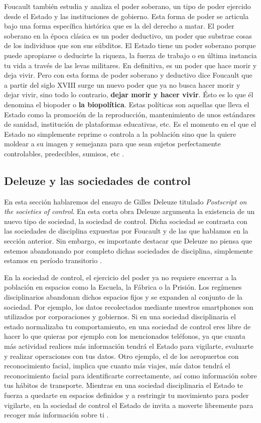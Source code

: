 \documentclass[11pt]{article}
\begin{document}
Foucault también estudia y analiza el poder soberano, un tipo de poder ejercido desde el Estado y las instituciones de gobierno. Esta forma de poder se articula bajo una forma específica histórica que es la del derecho a matar. El poder soberano en la época clásica es un poder deductivo, un poder que substrae cosas de los individuos que son sus súbditos. El Estado tiene un poder soberano porque puede apropiarse o deducirte la riqueza, la fuerza de trabajo o en última instancia tu vida a través de las levas militares. En definitiva, es un poder que hace morir y deja vivir. Pero con esta forma de poder soberano y deductivo dice Foucault que a partir del siglo XVIII surge un nuevo poder que ya no busca hacer morir y dejar vivir, sino todo lo contrario, \textbf{dejar morir y hacer vivir}. Ésto es lo que él denomina el biopoder o \textbf{la biopolítica}. Estas políticas son aquellas que lleva el Estado como la promoción de la reproducción, mantenimiento de unos estándares de sanidad, institución de plataformas educativas, etc. Es el momento en el que el Estado no simplemente reprime o controla a la población sino que la quiere moldear a su imagen y semejanza para que sean sujetos perfectamente controlables, predecibles, sumisos, etc \cite{ernesto-foucault}.
\subsection{Deleuze y las sociedades de control}
En esta sección hablaremos del ensayo de Gilles Deleuze titulado \textit{Postscript on the societies of control}. En esta corta obra Deleuze argumenta la existencia de un nuevo tipo de sociedad, la sociedad de control. Dicha sociedad se contrasta con las sociedades de disciplina expuestas por Foucault y de las que hablamos en la sección anterior. Sin embargo, es importante destacar que Deleuze no piensa que estemos abandonando por completo dichas sociedades de disciplina, simplemente estamos en período transitorio \cite{cp-societies}.

En la sociedad de control, el ejercicio del poder ya no requiere encerrar a la población en espacios como la Escuela, la Fábrica o la Prisión. Los regímenes disciplinarios abandonan dichos espacios fijos y se expanden al conjunto de la sociedad. Por ejemplo, los datos recolectados mediante nuestros smartphones son utilizados por corporaciones y gobiernos. Si en una sociedad disciplinaria el estado normalizaba tu comportamiento, en una sociedad de control eres libre de hacer lo que quieras por ejemplo con los mencionados teléfonos, ya que cuanta más actividad realices más información tendrá el Estado para vigilarte, evaluarte y realizar operaciones con tus datos. Otro ejemplo, el de los aeropuertos con reconocimiento facial, implica que cuanto más viajes, más datos tendrá el reconocimiento facial para identificarte correctamente, así como información sobre tus hábitos de transporte. Mientras en una sociedad disciplinaria el Estado te fuerza a quedarte en espacios definidos y a restringir tu movimiento para poder vigilarte, en la sociedad de control el Estado de invita a moverte libremente para recoger más información sobre ti \cite{cp-societies}.
\end{document}
